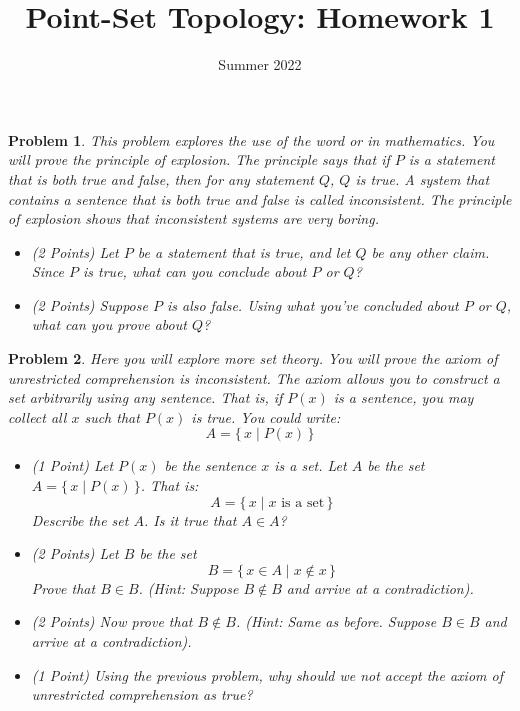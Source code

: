 \documentclass{article}
\title{Point-Set Topology: Homework 1}
\date{Summer 2022}
\theoremstyle{normal}
\newtheorem{problem}{Problem}
\begin{document}
    \maketitle
    \begin{problem}
        This problem explores the use of the word \textit{or} in mathematics.
        You will prove the \textit{principle of explosion}. The principle says
        that if $P$ is a statement that is both true and false, then for any
        statement $Q$, $Q$ is true. A system that contains a sentence that is
        both true and false is called \textit{inconsistent}. The principle of
        explosion shows that inconsistent systems are very boring.
        \begin{itemize}
            \item (2 Points) Let $P$ be a statement that is true, and let $Q$
                be any other claim. Since $P$ is true, what can you conclude
                about $P$ \textit{or} $Q$?
            \item (2 Points) Suppose $P$ is also false. Using what you've
                concluded about $P$ \textit{or} $Q$, what can you prove about
                $Q$?
        \end{itemize}
    \end{problem}
    \begin{problem}
        Here you will explore more set theory. You will prove the
        \textit{axiom of unrestricted comprehension} is inconsistent. The axiom
        allows you to construct a set arbitrarily using any sentence. That is,
        if $P(x)$ is a sentence, you may collect all $x$ such that $P(x)$ is
        true. You could write:
        \begin{equation}
            A=\{\,x\;|\;P(x)\,\}\nonumber
        \end{equation}
        \begin{itemize}
            \item (1 Point) Let $P(x)$ be the sentence $x$ \textit{is a set}.
                Let $A$ be the set $A=\{\,x\;|\;P(x)\,\}$. That is:
                \begin{equation}
                    A=\{\,x\;|\;x\textrm{ is a set}\,\}\nonumber
                \end{equation}
                Describe the set $A$. Is it true that $A\in{A}$?
            \item (2 Points) Let $B$ be the set
                \begin{equation}
                    B=\{\,x\in{A}\;|\;x\notin{x}\,\}\nonumber
                \end{equation}
                Prove that $B\in{B}$. (Hint: Suppose $B\notin{B}$ and arrive
                at a contradiction).
            \item (2 Points) Now prove that $B\notin{B}$.
                (Hint: Same as before. Suppose $B\in{B}$ and arrive at a
                contradiction).
            \item (1 Point) Using the previous problem, why should we not accept
                the axiom of unrestricted comprehension as true?
        \end{itemize}
    \end{problem}
\end{document}
